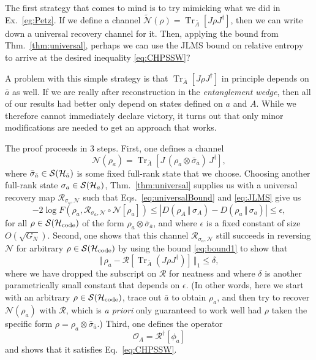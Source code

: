 \documentclass[a4paper,11pt]{article}
\newcommand{\Eq}[1]{Eq.~\eqref{#1}}
\newcommand{\Eqs}[2]{Eqs.~\eqref{#1} and \eqref{#2}}
\DeclareMathOperator{\Tr}{Tr}
\newcommand{\rent}[2]{D( #1 \, \Vert \, #2 )}
\newcommand{\Hil}{{\cal H}}
\newcommand{\Oh}{{\mathcal{O}}}
\newcommand{\mrm}[1]{\mathrm{#1}}
\begin{document}
The first strategy that comes to mind is to try mimicking what we did in Ex.~\ref{eg:Petz}.
If we define a channel $\tilde{\mathcal{N}}(\rho) = \Tr_{\bar{A}}[J \rho J^\dagger]$, then we can write down a universal recovery channel for it.
Then, applying the bound from Thm.~\ref{thm:universal}, perhaps we can use the JLMS bound on relative entropy to arrive at the desired inequality \eqref{eq:CHPSSW}?

A problem with this simple strategy is that $\Tr_{\bar{A}}[J \rho J^\dagger]$ in principle depends on $\bar{a}$ as well.
If we are really after reconstruction in the \emph{entanglement wedge}, then all of our results had better only depend on states defined on $a$ and $A$.
While we therefore cannot immediately declare victory, it turns out that only minor modifications are needed to get an approach that works.

The proof proceeds in 3 steps.
First, one defines a channel
\begin{equation}
\mathcal{N}(\rho_a) = \Tr_{\bar A} \left[ J \, (\rho_a \otimes \bar{\sigma}_{\bar{a}}) \, J^\dagger \right],
\end{equation}
where $\bar{\sigma}_{\bar{a}} \in \mathcal{S}(\Hil_{\bar{a}})$ is some fixed full-rank state that we choose.
Choosing another full-rank state $\sigma_a \in \mathcal{S}(\Hil_a)$, Thm.~\ref{thm:universal} supplies us with a universal recovery map $\mathcal{R}_{\sigma_{a}, \mathcal{N}}$ such that \Eqs{eq:universalBound}{eq:JLMS} give us
\begin{equation} \label{eq:bound1}
-2 \log F(\rho_a, \mathcal{R}_{\sigma_a, \mathcal{N}} \circ \mathcal{N} [\rho_a]) \leq |\rent{\rho_A}{\sigma_A} - \rent{\rho_a}{\sigma_a}| \leq \epsilon,
\end{equation}
for all $\rho \in \mathcal{S}(\Hil_\mrm{code})$ of the form $\rho_a \otimes \bar{\sigma}_{\bar{a}}$, and where $\epsilon$ is a fixed constant of size $O(\sqrt{G_N})$.
Second, one shows that this channel $\mathcal{R}_{\sigma_{a}, \mathcal{N}}$ still succeeds in reversing $\mathcal{N}$ for arbitrary $\rho \in \mathcal{S}(\Hil_\mrm{code})$ by using the bound \eqref{eq:bound1} to show that
\begin{equation}
\Vert \, \rho_a - \mathcal{R}[\Tr_{\bar{A}}(J \rho J^\dagger)] \, \Vert_1 \leq \delta,
\end{equation}
where we have dropped the subscript on $\mathcal{R}$ for neatness and where $\delta$ is another parametrically small constant that depends on $\epsilon$.
(In other words, here we start with an arbitrary $\rho \in \mathcal{S}(\Hil_\mrm{code})$, trace out $\bar{a}$ to obtain $\rho_a$, and then try to recover $\mathcal{N}(\rho_a)$ with $\mathcal{R}$, which is \emph{a priori} only guaranteed to work well had $\rho$ taken the specific form $\rho = \rho_a \otimes \bar{\sigma}_{\bar{a}}$.)
Third, one defines the operator
\begin{equation}
\Oh_A = \mathcal{R}^\dagger[\phi_a]
\end{equation}
and shows that it satisfies \Eq{eq:CHPSSW}.
\end{document}
